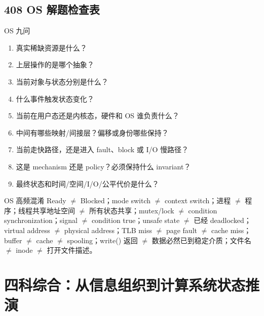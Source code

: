 \documentclass[11pt,a4paper,openany]{ctexbook}
\begin{document}
\section{408 OS 解题检查表}
\begin{examBox}{OS 九问}
\begin{enumerate}
  \item 真实稀缺资源是什么？
  \item 上层操作的是哪个抽象？
  \item 当前对象与状态分别是什么？
  \item 什么事件触发状态变化？
  \item 当前在用户态还是内核态，硬件和 OS 谁负责什么？
  \item 中间有哪些映射/间接层？偏移或身份哪些保持？
  \item 当前走快路径，还是进入 fault、block 或 I/O 慢路径？
  \item 这是 mechanism 还是 policy？必须保持什么 invariant？
  \item 最终状态和时间/空间/I/O/公平代价是什么？
\end{enumerate}
\end{examBox}

\begin{warnbox}{OS 高频混淆}
Ready $\neq$ Blocked；mode switch $\neq$ context switch；进程 $\neq$ 程序；线程共享地址空间 $\neq$ 所有状态共享；mutex/lock $\neq$ condition synchronization；signal $\neq$ condition true；unsafe state $\neq$ 已经 deadlocked；virtual address $\neq$ physical address；TLB miss $\neq$ page fault $\neq$ cache miss；buffer $\neq$ cache $\neq$ spooling；write() 返回 $\neq$ 数据必然已到稳定介质；文件名 $\neq$ inode $\neq$ 打开文件描述。
\end{warnbox}

\chapter{四科综合：从信息组织到计算系统状态推演}
\end{document}
